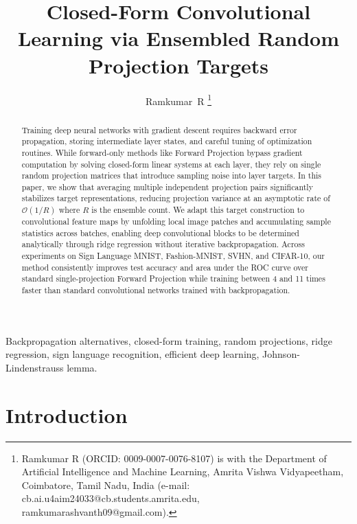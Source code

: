 \documentclass[journal]{IEEEtran}
\begin{document}
\title{Closed-Form Convolutional Learning via Ensembled Random Projection Targets}

\author{Ramkumar~R
\thanks{Ramkumar R (ORCID: 0009-0007-0076-8107) is with the Department of Artificial Intelligence and Machine Learning, Amrita Vishwa Vidyapeetham, Coimbatore, Tamil Nadu, India (e-mail: cb.ai.u4aim24033@cb.students.amrita.edu, ramkumarashvanth09@gmail.com).}
}


\maketitle

\begin{abstract}
Training deep neural networks with gradient descent requires backward error propagation, storing intermediate layer states, and careful tuning of optimization routines. While forward-only methods like Forward Projection bypass gradient computation by solving closed-form linear systems at each layer, they rely on single random projection matrices that introduce sampling noise into layer targets. In this paper, we show that averaging multiple independent projection pairs significantly stabilizes target representations, reducing projection variance at an asymptotic rate of $\mathcal{O}(1/R)$ where $R$ is the ensemble count. We adapt this target construction to convolutional feature maps by unfolding local image patches and accumulating sample statistics across batches, enabling deep convolutional blocks to be determined analytically through ridge regression without iterative backpropagation. Across experiments on Sign Language MNIST, Fashion-MNIST, SVHN, and CIFAR-10, our method consistently improves test accuracy and area under the ROC curve over standard single-projection Forward Projection while training between 4 and 11 times faster than standard convolutional networks trained with backpropagation.
\end{abstract}

\begin{IEEEkeywords}
Backpropagation alternatives, closed-form training, random projections, ridge regression, sign language recognition, efficient deep learning, Johnson-Lindenstrauss lemma.
\end{IEEEkeywords}

\section{Introduction}
\end{document}
